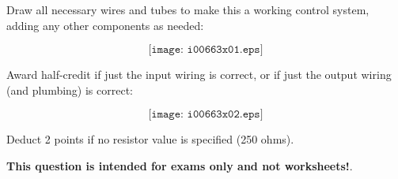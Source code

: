 

Draw all necessary wires and tubes to make this a working control system, adding any other components as needed:

$$\texttt{[image: i00663x01.eps]}$$







Award half-credit if just the input wiring is correct, or if just the output wiring (and plumbing) is correct:

$$\texttt{[image: i00663x02.eps]}$$

Deduct 2 points if no resistor value is specified (250 ohms).







{\bf This question is intended for exams only and not worksheets!}.



